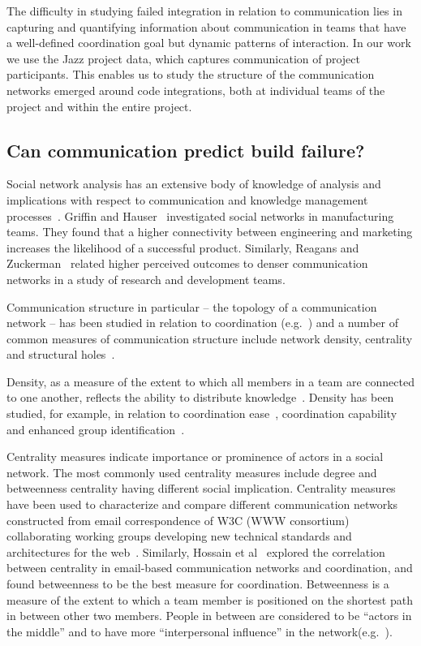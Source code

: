 The difficulty in studying failed integration in relation to communication lies
in capturing and quantifying information about communication in teams that have a
well-defined coordination goal but dynamic patterns of interaction. In our work
we use the Jazz project data, which captures communication of project
participants. This enables us to study the structure of the communication
networks emerged around code integrations, both at individual teams of the
project and within the entire project.

\subsection{Can communication predict build failure?}
\label{sec:ResearchQuestions}
Social network analysis has an extensive body of knowledge of analysis and implications with respect to communication and knowledge management
processes~\cite{Burt:1995vo,Freeman:1979rl}. Griffin and
Hauser~\cite{Griffin:1992ms} investigated social networks in manufacturing teams.
They found that a higher connectivity between engineering and marketing increases
the likelihood of a successful product. Similarly, Reagans and
Zuckerman~\cite{RayReagans:2001os} related higher perceived outcomes to denser
communication networks in a study of research and development teams.

Communication structure in particular -- the topology of a communication network
-- has been studied in relation to coordination
(e.g.~\cite{hossain:cscw:2006,hinds:cscw:2006}) and a number of common measures of
communication structure include network density, centrality and structural
holes~\cite{Wasserman:1994sq,Freeman:1979rl}.

Density, as a measure of the extent to which all members in a team are
connected to one another, reflects the ability to distribute
knowledge~\cite{Rulke:2000ys}. Density has been studied, for example, in relation
to coordination ease~\cite{hinds:cscw:2006}, coordination
capability~\cite{hossain:cscw:2006} and enhanced group
identification~\cite{RayReagans:2001os}.

Centrality measures indicate importance or prominence of actors in a
social network. The most commonly used centrality measures include degree and
betweenness centrality having different social implication. Centrality measures
have been used to characterize and compare different communication networks
constructed from email correspondence of W3C (WWW consortium) collaborating
working groups developing new technical standards and architectures for the
web~\cite{Gloor:2003cikm}. Similarly, Hossain et al~\cite{hossain:cscw:2006}
explored the correlation between centrality in email-based communication networks
and coordination, and found betweenness to be the best measure for coordination.
Betweenness is a measure of the extent to which a team member is
positioned on the shortest path in between other two members. People in between
are considered to be ``actors in the middle'' and to have more ``interpersonal
influence'' in the
network(e.g.~\cite{Gloor:2003cikm,zimmermann:icse:2008,hossain:cscw:2006}).

